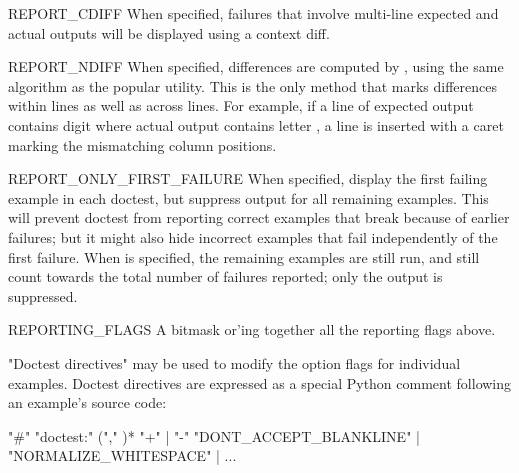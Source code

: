 \begin{datadesc}{REPORT_CDIFF}
    When specified, failures that involve multi-line expected and
    actual outputs will be displayed using a context diff.
\end{datadesc}

\begin{datadesc}{REPORT_NDIFF}
    When specified, differences are computed by ,
    using the same algorithm as the popular  utility.
    This is the only method that marks differences within lines as
    well as across lines.  For example, if a line of expected output
    contains digit  where actual output contains letter ,
    a line is inserted with a caret marking the mismatching column
    positions.
\end{datadesc}

\begin{datadesc}{REPORT_ONLY_FIRST_FAILURE}
  When specified, display the first failing example in each doctest,
  but suppress output for all remaining examples.  This will prevent
  doctest from reporting correct examples that break because of
  earlier failures; but it might also hide incorrect examples that
  fail independently of the first failure.  When
   is specified, the remaining
  examples are still run, and still count towards the total number of
  failures reported; only the output is suppressed.
\end{datadesc}

\begin{datadesc}{REPORTING_FLAGS}
    A bitmask or'ing together all the reporting flags above.
\end{datadesc}

"Doctest directives" may be used to modify the option flags for
individual examples.  Doctest directives are expressed as a special
Python comment following an example's source code:

\begin{productionlist}[doctest]
               {"\#" "doctest:" }
               { ("," )*}
               { }
               {"+" | "-"}
               {"DONT_ACCEPT_BLANKLINE" | "NORMALIZE_WHITESPACE" | ...}
\end{productionlist}

